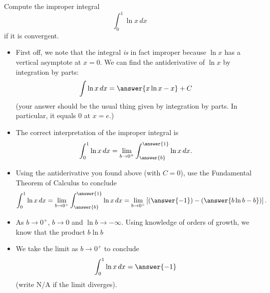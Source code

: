 \documentclass{ximera}
\begin{document}
\begin{example}
Compute the improper integral
\[ \int_0^1 \ln x \, dx \]
if it is convergent.
\begin{itemize}
\item First off, we note that the integral \textit{is} in fact improper because $\ln x$ has a vertical asymptote at $x = 0$.  We can find the antiderivative of $\ln x$ by integration by parts:
\[ \int \ln x \, dx = \answer{x \ln x - x} + C\]
(your answer should be the usual thing given by integration by parts. In particular, it equals $0$ at $x = e$.)
\item The correct interpretation of the improper integral is 
\[ \int_0^1 \ln x \, dx = \lim_{b \rightarrow 0^+} \int_{\answer{b}}^{\answer{1}} \ln x \, dx. \]
\item Using the antiderivative you found above (with $C = 0$), use the Fundamental Theorem of Calculus to conclude
\[ \int_0^1 \ln x \, dx = \lim_{b \rightarrow 0^+} \int_{\answer{b}}^{\answer{1}} \ln x \, dx = \lim_{b \rightarrow 0^+} \left[ \left( \answer{-1} \right) - \left(\answer{ b \ln b - b} \right) \right]. \]
\item As $b \rightarrow 0^+$, $b \rightarrow 0$ and $\ln b \rightarrow - \infty$. Using knowledge of orders of growth, we know that the product $b \ln b$
\begin{multipleChoice}
\end{multipleChoice}
\item We take the limit as $b \rightarrow 0^+$ to conclude
\[ \int_{0}^1 \ln x \, dx = \answer{-1} \]
(write N/A if the limit diverges).
\end{itemize}
\end{example}
\end{document}
